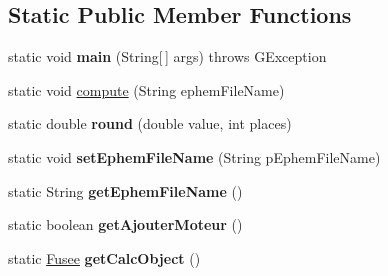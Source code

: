 \subsection*{Static Public Member Functions}
\begin{DoxyCompactItemize}
\item 
\mbox{\label{classpackage_i_h_m_1_1_i_h_m_principale_a48b0991c3619462acbd2e85bc2f5a44e}} 
static void {\bfseries main} (String\mbox{[}$\,$\mbox{]} args)  throws G\+Exception 
\item 
static void \mbox{\hyperlink{classpackage_i_h_m_1_1_i_h_m_principale_a95db31bde64c587e7d75431b31a86be1}{compute}} (String ephem\+File\+Name)
\item 
\mbox{\label{classpackage_i_h_m_1_1_i_h_m_principale_a8dba008957788a6dcee15cdb6845b8df}} 
static double {\bfseries round} (double value, int places)
\item 
\mbox{\label{classpackage_i_h_m_1_1_i_h_m_principale_aeee13304a7e1c5257836c5f9ead46001}} 
static void {\bfseries set\+Ephem\+File\+Name} (String p\+Ephem\+File\+Name)
\item 
\mbox{\label{classpackage_i_h_m_1_1_i_h_m_principale_a3d850a70835af0dd85bc4ab75a5655f9}} 
static String {\bfseries get\+Ephem\+File\+Name} ()
\item 
\mbox{\label{classpackage_i_h_m_1_1_i_h_m_principale_a35c976eb40d2eef2dbb89b2b0befb0fb}} 
static boolean {\bfseries get\+Ajouter\+Moteur} ()
\item 
\mbox{\label{classpackage_i_h_m_1_1_i_h_m_principale_a22587ec06c624780d7bc60e259d50a05}} 
static \mbox{\hyperlink{classpackage_i_h_m_1_1_fusee}{Fusee}} {\bfseries get\+Calc\+Object} ()
\end{DoxyCompactItemize}

